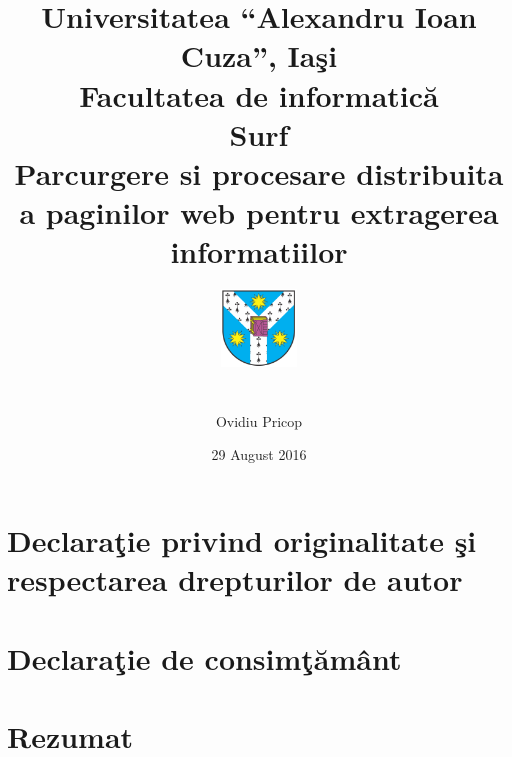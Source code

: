 \documentclass[12pt,oneside]{report}
\newcommand{\GLOBALDATE}{29 August 2016}
\newcommand{\chaptertitle}[1]{\LARGE{#1}}
\begin{document}
\title{
	\large{Universitatea \enquote{Alexandru Ioan Cuza}, Ia\c{s}i} \\
	\vspace{0.5cm}
	\large{\textbf{Facultatea de informatic\u{a}}} \\
      \vspace{2cm}
	\LARGE{Surf} \\
	\vspace{1cm}
	\large{Parcurgere si procesare distribuita a paginilor web pentru extragerea informatiilor} \\
	\vspace{1cm}
	\vspace{1cm}
	\includegraphics[width=2cm,height=3cm,keepaspectratio]{uaic_sigla.png}
}

\author{Ovidiu Pricop}
\date{\GLOBALDATE}

\maketitle


\chapter*{
	\large{
		Declara\c{t}ie privind originalitate \c{s}i respectarea drepturilor de autor
	}
}



\chapter*{
	\large{
		Declara\c{t}ie de consim\c{t}\u{a}m\^{a}nt
	}
}



\chapter*{\chaptertitle{Rezumat}}

\newpage


\end{document}
